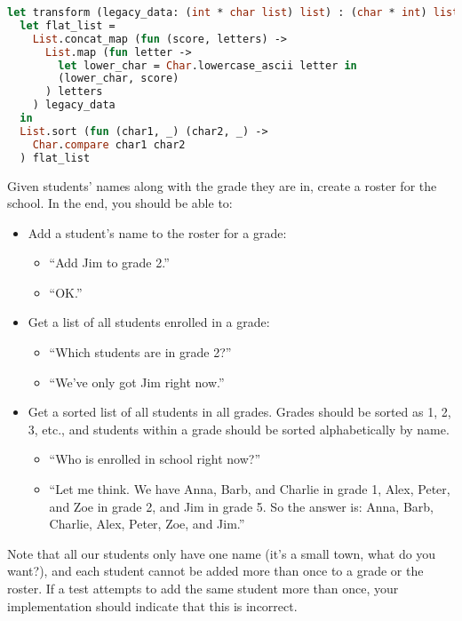 \begin{lstlisting}[language=OCaml]
let transform (legacy_data: (int * char list) list) : (char * int) list =
  let flat_list =
    List.concat_map (fun (score, letters) ->
      List.map (fun letter ->
        let lower_char = Char.lowercase_ascii letter in
        (lower_char, score)
      ) letters
    ) legacy_data
  in
  List.sort (fun (char1, _) (char2, _) ->
    Char.compare char1 char2
  ) flat_list
\end{lstlisting}

Given students' names along with the grade they are in, create a roster for the school.
In the end, you should be able to:
\begin{itemize}
  \item Add a student's name to the roster for a grade:
        \begin{itemize}
          \item ``Add Jim to grade 2.''
          \item ``OK.''
        \end{itemize}
  \item Get a list of all students enrolled in a grade:
        \begin{itemize}
          \item ``Which students are in grade 2?''
          \item ``We've only got Jim right now.''
        \end{itemize}
  \item Get a sorted list of all students in all grades.
        Grades should be sorted as 1, 2, 3, etc., and students within a grade should be sorted alphabetically by name.
        \begin{itemize}
          \item ``Who is enrolled in school right now?''
          \item ``Let me think.
                We have Anna, Barb, and Charlie in grade 1, Alex, Peter, and Zoe in grade 2, and Jim in grade 5.
                So the answer is: Anna, Barb, Charlie, Alex, Peter, Zoe, and Jim.''
        \end{itemize}
\end{itemize}
Note that all our students only have one name (it's a small town, what do you want?), and each student cannot be added more than once to a grade or the roster.
If a test attempts to add the same student more than once, your implementation should indicate that this is incorrect.

